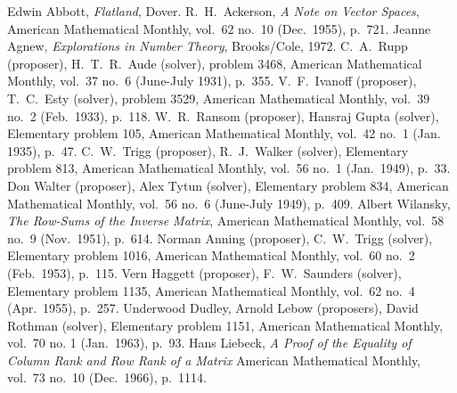 \begin{thebibliography}{\makebox[2em][c]{{}\hfil{}}}
\thispagestyle{empty}
\small\setlength{\itemsep}{0ex} \setlength{\parsep}{0ex}
  Edwin Abbott,
  \emph{Flatland},
  Dover.
  R.\ H.\ Ackerson,
  \emph{A Note on Vector Spaces},
  American Mathematical Monthly,
  vol.\ 62 no.\ 10 (Dec.\ 1955),
  p.~721.
  Jeanne Agnew,
  \emph{Explorations in Number Theory},
  Brooks/Cole,
  1972.
  C.\ A.\ Rupp (proposer), H.\ T.\ R.\ Aude (solver),
  problem 3468,
  American Mathematical Monthly,
  vol.\ 37 no.\ 6 (June-July 1931),
  p.~355.
  V.\ F.\ Ivanoff (proposer), T.\ C.\ Esty (solver),
  problem 3529,
  American Mathematical Monthly,
  vol.\ 39 no.\ 2 (Feb.\ 1933),
  p.~118.
  W.\ R.\ Ransom (proposer), Hansraj Gupta (solver),
  Elementary problem 105,
  American Mathematical Monthly,
  vol.\ 42 no.\ 1 (Jan. 1935),
  p.~47.
  C.\ W.\ Trigg (proposer), R.\ J.\ Walker (solver),
  Elementary problem 813,
  American Mathematical Monthly,
  vol.\ 56 no.\ 1 (Jan.\ 1949),
  p.~33.
  Don Walter (proposer), Alex Tytun (solver),
  Elementary problem 834,
  American Mathematical Monthly,
  vol.\ 56 no.\ 6 (June-July 1949),
  p.~409.
  Albert Wilansky,
  \emph{The Row-Sums of the Inverse Matrix},
  American Mathematical Monthly,
  vol.\ 58 no.\ 9 (Nov.\ 1951),
  p.~614.
  Norman Anning (proposer), C.\ W.\ Trigg (solver),
  Elementary problem 1016,
  American Mathematical Monthly,
  vol.\ 60 no.\ 2 (Feb.\ 1953),
  p.~115.
  Vern Haggett (proposer), F.\ W.\ Saunders (solver),
  Elementary problem 1135,
  American Mathematical Monthly,
  vol.\ 62 no.\ 4 (Apr.\ 1955),
  p.~257.
  Underwood Dudley, Arnold Lebow (proposers), David Rothman (solver),
  Elementary problem 1151,
  American Mathematical Monthly,
  vol.\ 70 no. 1 (Jan.\ 1963),
  p.~93.
  Hans Liebeck,
  \emph{A Proof of the Equality of Column Rank and Row Rank of a Matrix}
  American Mathematical Monthly,
  vol.\ 73 no.\ 10 (Dec.\ 1966),
  p.~1114.

\end{thebibliography}
